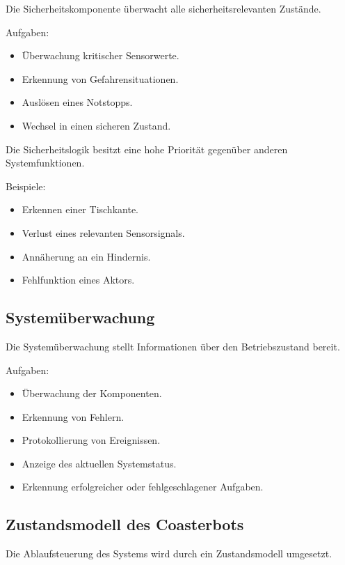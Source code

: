 Die Sicherheitskomponente überwacht alle sicherheitsrelevanten Zustände.

Aufgaben:

\begin{itemize}
\tightlist
\item
  Überwachung kritischer Sensorwerte.
\item
  Erkennung von Gefahrensituationen.
\item
  Auslösen eines Notstopps.
\item
  Wechsel in einen sicheren Zustand.
\end{itemize}

Die Sicherheitslogik besitzt eine hohe Priorität gegenüber anderen
Systemfunktionen.

Beispiele:

\begin{itemize}
\tightlist
\item
  Erkennen einer Tischkante.
\item
  Verlust eines relevanten Sensorsignals.
\item
  Annäherung an ein Hindernis.
\item
  Fehlfunktion eines Aktors.
\end{itemize}

\subsection{Systemüberwachung}\label{systemuxfcberwachung-1}

Die Systemüberwachung stellt Informationen über den Betriebszustand
bereit.

Aufgaben:

\begin{itemize}
\tightlist
\item
  Überwachung der Komponenten.
\item
  Erkennung von Fehlern.
\item
  Protokollierung von Ereignissen.
\item
  Anzeige des aktuellen Systemstatus.
\item
  Erkennung erfolgreicher oder fehlgeschlagener Aufgaben.
\end{itemize}

\subsection{Zustandsmodell des
Coasterbots}\label{zustandsmodell-des-coasterbots}

Die Ablaufsteuerung des Systems wird durch ein Zustandsmodell umgesetzt.

